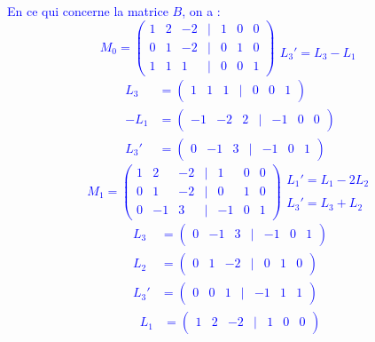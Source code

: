 \documentclass[a4paper,12pt]{article}
\begin{document}
\textcolor{blue}{En ce qui concerne la matrice $B$, on a :
\[ M_0=
\begin{pmatrix}
\boxed{1} & 2 & -2 & | & 1 & 0 & 0 \\
0 & 1 & -2 & | & 0 & 1 & 0 \\
1 & 1 & 1 & | & 0 & 0 & 1
\end{pmatrix} 
\begin{array}{c} \\
\\
L_3' = L_3 - L_1
\end{array}
\]
\[
\begin{aligned}
L_3 &= \begin{pmatrix}
1 & 1 & 1 & | & 0 & 0 & 1
\end{pmatrix} \\
-L_1 &= \begin{pmatrix}
-1 & -2 & 2 & | & -1 & 0 & 0
\end{pmatrix} \\
L_3' &= \begin{pmatrix}
0 & -1 & 3 & | & -1 & 0 & 1
\end{pmatrix}
\end{aligned}
\]
\[ M_1=
\begin{pmatrix}
1 & 2 & -2 & | & 1 & 0 & 0 \\
0 & \boxed{1} & -2 & | & 0 & 1 & 0 \\
0 & -1 & 3 & | & -1 & 0 & 1
\end{pmatrix} 
\begin{array}{c} L_1' = L_1-2L_2 \\
 \\
L_3' = L_3 + L_2
\end{array}
\]
\[
\begin{aligned}
L_3 &= \begin{pmatrix}
0 & -1 & 3 & | & -1 & 0 & 1
\end{pmatrix} \\
L_2 &= \begin{pmatrix}
0 & 1 & -2 & | & 0 & 1 & 0
\end{pmatrix} \\
L_3' &= \begin{pmatrix}
0 & 0 & 1 & | & -1 & 1 & 1
\end{pmatrix}
\end{aligned}
\]
\[
\begin{aligned}
L_1 &= \begin{pmatrix}
1 & 2 & -2 & | & 1 & 0 & 0
\end{pmatrix} \\

\end{aligned}\]}
\end{document}
